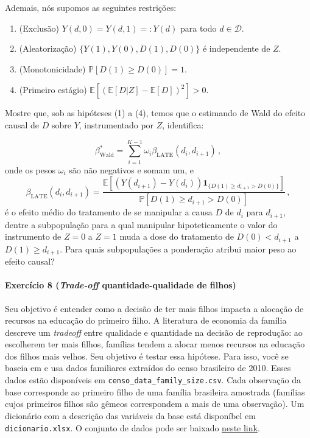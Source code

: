 \documentclass[10pt,a4paper]{article}
\begin{document}
Ademais, nós supomos as seguintes restrições:

\begin{enumerate}
	\item (Exclusão) $Y(d,0) = Y(d,1) =: Y(d)$ para todo $d \in \mathcal{D}$.
	\item (Aleatorização) $\{Y(1),Y(0),D(1),D(0)\}$ é independente de $Z$.
	\item (Monotonicidade)  $\mathbb{P}[D(1)\geq D(0)]=1$.
	\item (Primeiro estágio)  $\mathbb{E}[(\mathbb{E}[D|Z]-\mathbb{E}[D])^2]>0$.
\end{enumerate}

Mostre que, sob as hipóteses (1) a (4), temos que o estimando de Wald do efeito causal de $D$ sobre $Y$, instrumentado por $Z$, identifica:

$$\beta^*_{\text{Wald}} = \sum_{i=1}^{K-1} \omega_{i}\beta_{\text{LATE}}(d_i,d_{i+1})\, , $$
onde os pesos $\omega_i$ são não negativos e somam um, e $$\beta_{\text{LATE}}(d_i,d_{i+1}) = \frac{\mathbb{E}[(Y(d_{i+1})-Y(d_i))\mathbf{1}_{\{D(1)\geq d_{i+1} > D(0)\}}]}{\mathbb{P}[D(1)\geq d_{i+1} > D(0)]}\, ,$$
é o efeito médio do tratamento de se manipular a causa $D$ de $d_i$ para $d_{i+1}$, dentre a subpopulação para a qual manipular hipoteticamente o valor do instrumento de $Z=0$ a $Z=1$ muda a dose do tratamento de $D(0) < d_{i+1}$ a $D(1) \geq d_{i+1}$. Para quais subpopulações a ponderação atribui maior peso ao efeito causal?
\vspace{0.5em}


\paragraph{Exercício 8 (\textit{Trade-off} quantidade-qualidade de filhos)} Seu objetivo é entender como a decisão de ter mais filhos impacta a alocação de recursos na educação do primeiro filho. A literatura de economia da família descreve um \textit{tradeoff} entre qualidade e quantidade na decisão de reprodução: ao escolherem ter mais filhos, famílias tendem a alocar menos recursos na educação dos filhos mais velhos. Seu objetivo é testar essa hipótese. Para isso, você se baseia em \citet{Ponczek2012} e usa dados familiares extraídos do censo brasileiro de 2010. Esses dados estão disponíveis em \texttt{censo\_data\_family\_size.csv}. Cada observação da base corresponde ao primeiro filho de uma família brasileira amostrada (famílias cujos primeiros filhos são gêmeos correspondem a mais de uma observação). Um dicionário com a descrição das variáveis da base está disponíbel em \texttt{dicionario.xlsx}. O conjunto de dados pode ser baixado \href{https://www.dropbox.com/scl/fi/2q5gv4c3uuxfehvzmjyjq/dados_censo.zip?rlkey=enbbd3iltf9gp7bic991zf4sw&st=zj6v1jg1&dl=0}{neste link}.
\end{document}
